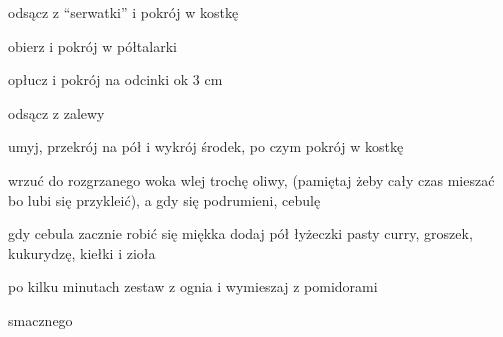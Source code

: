 \documentclass[./KNIGA.tex]{subfiles}
\begin{document}
\begin{description}
\item [tofu] odsącz z “serwatki” i pokrój w kostkę
\item [cebulę] obierz i pokrój w półtalarki
\item [kiełki] opłucz i pokrój na odcinki ok 3 cm
\item [groszek i kukurydzę] odsącz z zalewy
\item [pomidory] umyj, przekrój na pół i wykrój środek, po czym pokrój w kostkę
\item [tofu] wrzuć do rozgrzanego woka wlej trochę oliwy, (pamiętaj żeby cały czas mieszać bo lubi się przykleić), a gdy się podrumieni, cebulę
\item gdy cebula zacznie robić się miękka dodaj pół łyżeczki pasty curry, groszek, kukurydzę, kiełki i zioła
\item po kilku minutach zestaw z ognia i wymieszaj z pomidorami
\item smacznego 
\end{description}
\end{document}
